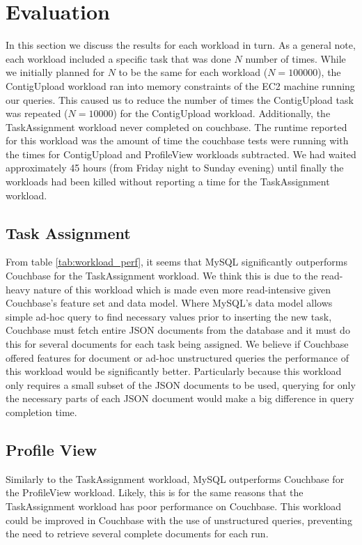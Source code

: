 \documentclass[10pt, conference, compsocconf]{IEEEtran}
\begin{document}
\section{Evaluation}\label{sec:eval}
In this section we discuss the results for each workload in turn. As a general
note, each workload included a specific task that was done $N$ number of times.
While we initially planned for $N$ to be the same for each workload
($N=100000$), the ContigUpload workload ran into memory constraints of the
EC2 machine running our queries. This caused us to reduce the number of times
the ContigUpload task was repeated ($N=10000$) for the ContigUpload workload.
Additionally, the TaskAssignment workload never completed on couchbase. The
runtime reported for this workload was the amount of time the couchbase tests
were running with the times for ContigUpload and ProfileView workloads
subtracted. We had waited approximately 45 hours (from Friday night to Sunday
evening) until finally the workloads had been killed without reporting a time
for the TaskAssignment workload.

\subsection{Task Assignment}
From table \ref{tab:workload_perf}, it seems that MySQL significantly
outperforms Couchbase for the TaskAssignment workload. We think this is due to
the read-heavy nature of this workload which is made even more read-intensive
given Couchbase's feature set and data model. Where MySQL's data model allows
simple ad-hoc query to find necessary values prior to inserting the new task,
Couchbase must fetch entire JSON documents from the database and it must do
this for several documents for each task being assigned. We believe if
Couchbase offered features for document or ad-hoc unstructured queries the
performance of this workload would be significantly better. Particularly
because this workload only requires a small subset of the JSON documents to be
used, querying for only the necessary parts of each JSON document would make a
big difference in query completion time.

\subsection{Profile View}
Similarly to the TaskAssignment workload, MySQL outperforms Couchbase for the
ProfileView workload. Likely, this is for the same reasons that the
TaskAssignment workload has poor performance on Couchbase. This workload could
be improved in Couchbase with the use of unstructured queries, preventing the
need to retrieve several complete documents for each run.
\end{document}
